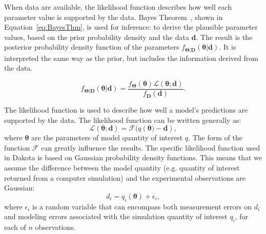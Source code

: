 When data are available, the likelihood function describes how well
each parameter value is supported by the data. Bayes
Theorem~\cite{Jaynes}, shown in Equation~\ref{eq:BayesThm}, is used
for inference: to derive the plausible parameter values, based on the
prior probability density and the data $\boldsymbol{d}$. The result is
the posterior probability density function of the parameters
$f_{\boldsymbol{{\Theta |D}}}\left( \boldsymbol{{\theta |d}}
\right)$. It is interpreted the same way as the prior, but includes
the information derived from the data.
 
\begin{equation}
{f_{\boldsymbol{\Theta |D}}}\left( \boldsymbol{\theta |d} \right) = \frac{{{f_{\boldsymbol{\Theta}}}\left( \boldsymbol{\theta}  \right)\mathcal{L}\left( \boldsymbol{\theta;d} \right)}}{{{f_{\boldsymbol{D}}}\left( \boldsymbol{d} \right)}}. \label{eq:BayesThm}
\end{equation}



The likelihood function is used to describe how well a model's
predictions are supported by the data.  The likelihood function can be
written generally as:
\begin{equation*}
  \mathcal{L}\left(\boldsymbol{{\theta ;d}} \right) =  \mathcal{F}(q(\boldsymbol{\theta)} -\boldsymbol{d}),
\end{equation*}
where $\boldsymbol{\theta}$ are the parameters of model quantity of
interest $q$.  The form of the function $\mathcal{F}$ can greatly
influence the results.  The specific likelihood function used in
Dakota is based on Gaussian probability density functions. This means
that we assume the difference between the model quantity
(e.g. quantity of interest returned from a computer simulation) and
the experimental observations are Gaussian:
\begin{equation}\label{eq:model}
d_i = q_i(\boldsymbol{\theta}) + \epsilon_i,
\end{equation}
where $\epsilon_i$ is a random variable that can encompass both
measurement errors on $d_i$ and modeling errors associated with the
simulation quantity of interest $q_i$, for each of $n$ observations.

